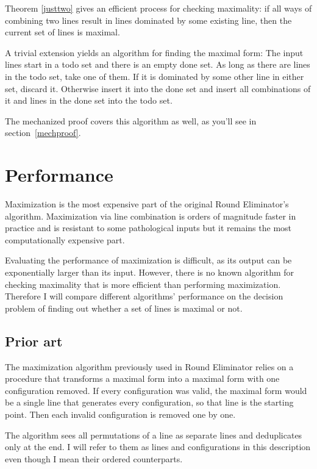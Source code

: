 \documentclass[english, 12pt, a4paper, sci, a-1b, online]{aaltothesis}
\begin{document}
Theorem \ref{justtwo} gives an efficient process for checking maximality: if all ways of combining two lines result in lines dominated by some existing line, then the current set of lines is maximal.

A trivial extension yields an algorithm for finding the maximal form: The input lines start in a todo set and there is an empty done set. As long as there are lines in the todo set, take one of them. If it is dominated by some other line in either set, discard it. Otherwise insert it into the done set and insert all combinations of it and lines in the done set into the todo set.

The mechanized proof covers this algorithm as well, as you'll see in section~\ref{mechproof}.

\section{Performance}

Maximization is the most expensive part of the original Round Eliminator's algorithm. Maximization via line combination is orders of magnitude faster in practice and is resistant to some pathological inputs but it remains the most computationally expensive part. %

Evaluating the performance of maximization is difficult, as its output can be exponentially larger than its input. However, there is no known algorithm for checking maximality that is more efficient than performing maximization. Therefore I will compare different algorithms' performance on the decision problem of finding out whether a set of lines is maximal or not.

\subsection{Prior art}

The maximization algorithm previously used in Round Eliminator relies on a procedure that transforms a maximal form into a maximal form with one configuration removed. If every configuration was valid, the maximal form would be a single line that generates every configuration, so that line is the starting point. Then each invalid configuration is removed one by one.

The algorithm sees all permutations of a line as separate lines and deduplicates only at the end. I will refer to them as lines and configurations in this description even though I mean their ordered counterparts.
\end{document}

